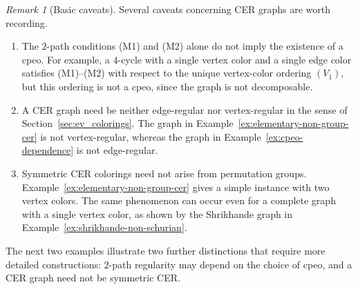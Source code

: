 \documentclass[12pt]{amsart}
\theoremstyle{plain}
\theoremstyle{definition}
\theoremstyle{remark}
\newtheorem{remark}[theorem]{Remark}
\newcommand{\1}{\mathbf{1}}
\begin{document}
\begin{remark}[Basic caveats]
Several caveats concerning CER graphs are worth recording.
\begin{enumerate}
    \item[(i)] The $2$-path conditions (M1) and (M2) alone do not imply the
    existence of a cpeo. For example, a $4$-cycle with a single vertex color
    and a single edge color satisfies (M1)--(M2) with respect to the unique
    vertex-color ordering $(V_1)$, but this ordering is not a cpeo, since the
    graph is not decomposable.

    \item[(ii)] A CER graph need be neither edge-regular nor vertex-regular in
    the sense of Section~\ref{sec:ev_colorings}. The graph in
    Example~\ref{ex:elementary-non-group-cer} is not vertex-regular, whereas
    the graph in Example~\ref{ex:cpeo-dependence} is not edge-regular.

    \item[(iii)] Symmetric CER colorings need not arise from permutation
    groups. Example~\ref{ex:elementary-non-group-cer} gives a simple instance
    with two vertex colors. The same phenomenon can occur even for a complete
    graph with a single vertex color, as shown by the Shrikhande graph in
    Example~\ref{ex:shrikhande-non-schurian}.
\end{enumerate}
\end{remark}

The next two examples illustrate two further distinctions that require more
detailed constructions: $2$-path regularity may depend on the choice of cpeo,
and a CER graph need not be symmetric CER.
\end{document}
